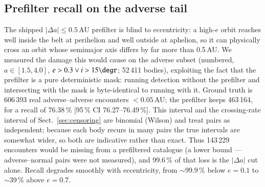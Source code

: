 \documentclass{aa}
\begin{document}
\subsection{Prefilter recall on the adverse tail}
\label{sec:prefilter}

The shipped $|\Delta a|\leq0.5$\,AU prefilter is blind to eccentricity: a
high-$e$ orbit reaches well inside the belt at perihelion and well outside at
aphelion, so it can physically cross an orbit whose semimajor axis differs by
far more than 0.5\,AU. We measured the damage this would cause on the adverse
subset (numbered, $a\in[1.5, 4.0]$, $e>0.3 \lor i>15\degr$; 52\,411 bodies),
exploiting the fact that the prefilter is a pure deterministic mask: running
detection without the prefilter and intersecting with the mask is
byte-identical to running with it. Ground truth is 606\,393 real
adverse--adverse encounters $<0.05$\,AU; the prefilter keeps 463\,164, for a
recall of 76.38\,\% [95\,\% CI 76.27--76.49\,\%]. This interval and the
crossing-rate interval of Sect.~\ref{sec:censoring} are binomial (Wilson) and
treat pairs as independent; because each body recurs in many pairs the true
intervals are somewhat wider, so both are indicative rather than exact. Thus
143\,229 encounters would
be missing from a prefiltered catalogue (a lower bound --- adverse--normal pairs
were not measured), and 99.6\,\% of that loss is the $|\Delta a|$ cut alone.
Recall degrades smoothly with eccentricity, from $\sim$99.9\,\% below $e=0.1$ to
$\sim$39\,\% above $e=0.7$.
\end{document}
